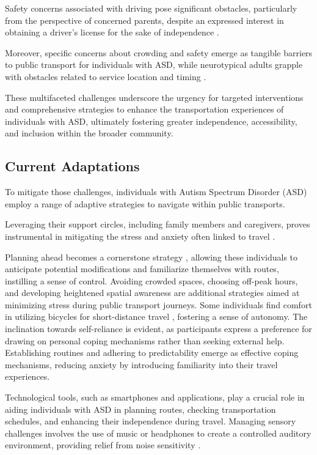     Safety concerns associated with driving pose significant obstacles, particularly from the perspective of concerned parents, despite an expressed interest in obtaining a driver's license for the sake of independence \cite{deka_co-principal_nodate}. 

    Moreover, specific concerns about crowding and safety emerge as tangible barriers to public transport for individuals with ASD, while neurotypical adults grapple with obstacles related to service location and timing \cite{falkmer_viewpoints_2015}. 
    
    These multifaceted challenges underscore the urgency for targeted interventions and comprehensive strategies to enhance the transportation experiences of individuals with ASD, ultimately fostering greater independence, accessibility, and inclusion within the broader community.

\subsection{Current Adaptations}

   To mitigate those challenges, individuals with Autism Spectrum Disorder (ASD) employ a range of adaptive strategies to navigate within public transports. 
   
   Leveraging their support circles, including family members and caregivers, proves instrumental in mitigating the stress and anxiety often linked to travel \cite{deka_co-principal_nodate}. 
   
   Planning ahead becomes a cornerstone strategy \cite{haas_experiences_nodate}, allowing these individuals to anticipate potential modifications and familiarize themselves with routes, instilling a sense of control.
   Avoiding crowded spaces, choosing off-peak hours, and developing heightened spatial awareness are additional strategies aimed at minimizing stress during public transport journeys.
   Some individuals find comfort in utilizing bicycles for short-distance travel \cite{falkmer_viewpoints_2015}, fostering a sense of autonomy. The inclination towards self-reliance is evident, as participants express a preference for drawing on personal coping mechanisms rather than seeking external help. Establishing routines and adhering to predictability emerge as effective coping mechanisms, reducing anxiety by introducing familiarity into their travel experiences. 
   
   Technological tools, such as smartphones and applications, play a crucial role in aiding individuals with ASD in planning routes, checking transportation schedules, and enhancing their independence during travel. 
   Managing sensory challenges involves the use of music or headphones to create a controlled auditory environment, providing relief from noise sensitivity \cite{haas_experiences_nodate}. 
   
